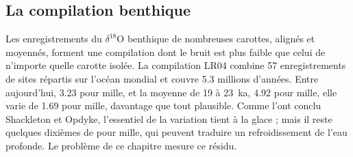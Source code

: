 
\subsection*{La compilation benthique}

Les enregistrements du $\delta^{18}$O benthique de nombreuses carottes, alignés et moyennés, forment une compilation dont le bruit
est plus faible que celui de n'importe quelle carotte isolée. La compilation LR04 combine 57 enregistrements de sites répartis sur
l'océan mondial et couvre 5.3 millions d'années. Entre aujourd'hui, \num{3.23} pour mille, et la moyenne de
\num{19} à \qty{23}{ka}, \num{4.92} pour mille, elle varie de \num{1.69} pour mille, davantage que tout  plausible. Comme l'ont conclu Shackleton et Opdyke, l'essentiel de la variation tient à la glace ;
mais il reste quelques dixièmes de pour mille, qui peuvent traduire un refroidissement de l'eau profonde. Le problème de ce chapitre mesure ce résidu.

